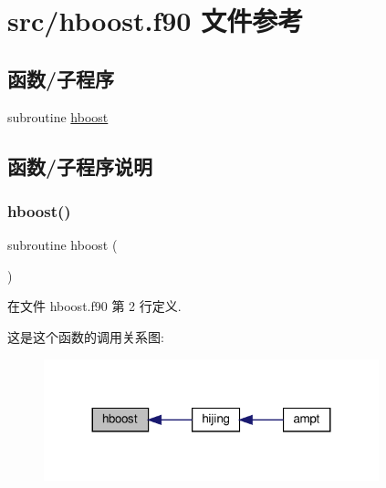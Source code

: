 \hypertarget{hboost_8f90}{}\section{src/hboost.f90 文件参考}
\label{hboost_8f90}
\subsection*{函数/子程序}
\begin{DoxyCompactItemize}
\item 
subroutine \mbox{\hyperlink{hboost_8f90_a97f25a80928c230c715fd9bbc156d650}{hboost}}
\end{DoxyCompactItemize}


\subsection{函数/子程序说明}
\mbox{\label{hboost_8f90_a97f25a80928c230c715fd9bbc156d650}} 
\subsubsection{\texorpdfstring{hboost()}{hboost()}}
{\footnotesize\ttfamily subroutine hboost (\begin{DoxyParamCaption}{ }\end{DoxyParamCaption})}



在文件 hboost.\+f90 第 2 行定义.

这是这个函数的调用关系图\+:
\nopagebreak
\begin{figure}[H]
\begin{center}
\leavevmode
\includegraphics[width=275pt]{hboost_8f90_a97f25a80928c230c715fd9bbc156d650_icgraph}
\end{center}
\end{figure}
